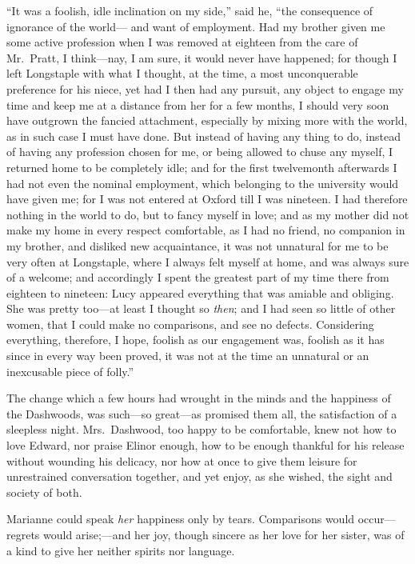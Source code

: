 \documentclass{article}
\begin{document}
``It was a foolish, idle inclination on my side,''
said he, ``the consequence of ignorance of the world---%
and want of employment.  Had my brother given me
some active profession when I was removed at eighteen
from the care of Mr.\ Pratt, I think---nay, I am sure,
it would never have happened; for though I left Longstaple
with what I thought, at the time, a most unconquerable
preference for his niece, yet had I then had any pursuit,
any object to engage my time and keep me at a distance
from her for a few months, I should very soon have
outgrown the fancied attachment, especially by mixing
more with the world, as in such case I must have done.
But instead of having any thing to do, instead of having any
profession chosen for me, or being allowed to chuse any myself,
I returned home to be completely idle; and for the first
twelvemonth afterwards I had not even the nominal employment,
which belonging to the university would have given me;
for I was not entered at Oxford till I was nineteen.
I had therefore nothing in the world to do, but to fancy
myself in love; and as my mother did not make my home
in every respect comfortable, as I had no friend,
no companion in my brother, and disliked new acquaintance,
it was not unnatural for me to be very often at Longstaple,
where I always felt myself at home, and was always sure
of a welcome; and accordingly I spent the greatest part
of my time there from eighteen to nineteen: Lucy appeared
everything that was amiable and obliging.  She was pretty
too---at least I thought so \emph{then}; and I had seen so little
of other women, that I could make no comparisons, and see
no defects.  Considering everything, therefore, I hope,
foolish as our engagement was, foolish as it has since
in every way been proved, it was not at the time an unnatural
or an inexcusable piece of folly.''

The change which a few hours had wrought in the minds
and the happiness of the Dashwoods, was such---so great---as
promised them all, the satisfaction of a sleepless night.
Mrs.\ Dashwood, too happy to be comfortable, knew not how
to love Edward, nor praise Elinor enough, how to be enough
thankful for his release without wounding his delicacy,
nor how at once to give them leisure for unrestrained
conversation together, and yet enjoy, as she wished,
the sight and society of both.

Marianne could speak \emph{her} happiness only by tears.
Comparisons would occur---regrets would arise;---and her joy,
though sincere as her love for her sister, was of a kind to
give her neither spirits nor language.
\end{document}
